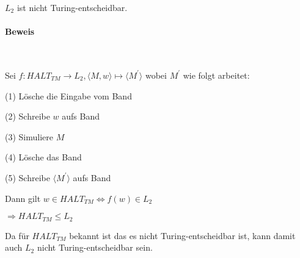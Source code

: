 $L_2$ ist nicht Turing-entscheidbar.

\paragraph*{Beweis}~

Sei $f: HALT_{TM} \to L_2, \langle M, w \rangle \mapsto \langle M^\prime \rangle$ wobei $M^\prime$
wie folgt arbeitet:

(1) Lösche die Eingabe vom Band

(2) Schreibe $w$ aufs Band

(3) Simuliere $M$ 

(4) Lösche das Band

(5) Schreibe $\langle M^\prime \rangle$ aufs Band

Dann gilt $w \in HALT_{TM} \Leftrightarrow f(w) \in L_2$

$\Rightarrow HALT_{TM} \leq L_2$ 

Da für $HALT_{TM}$ bekannt ist das es nicht Turing-entscheidbar ist, kann damit auch $L_2$ nicht Turing-entscheidbar sein.  